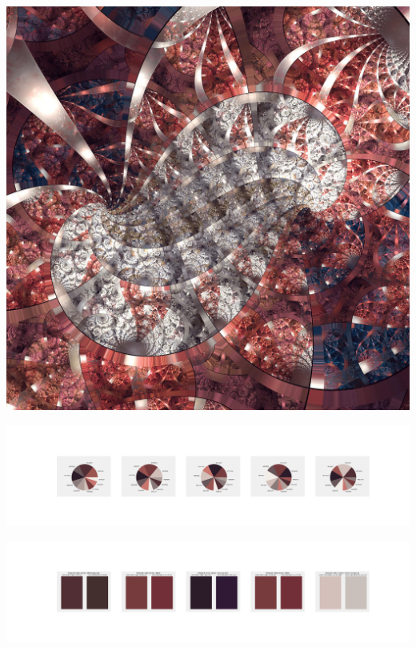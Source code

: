 \documentclass[11pt]{article}
\begin{document}
\begin{landscape}
    \begin{center}
    \includegraphics[width=\textwidth]{./nbimg/file (266).jpg}
    \end{center}

    \begin{center}
    \includegraphics[width=250mm]{./nbimg/pie-185.jpg}
    \end{center}

    \begin{center}
    \includegraphics[width=250mm]{./nbimg/peak-185.jpg}
    \end{center}
    


\end{landscape}
\end{document}
